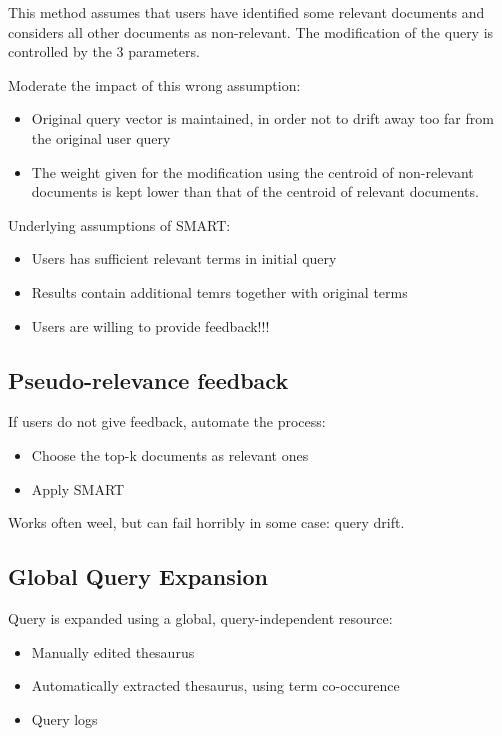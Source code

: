 This method assumes that users have identified some relevant documents
and considers all other documents as non-relevant. The modification of
the query is controlled by the 3 parameters.

Moderate the impact of this wrong assumption:
\begin{itemize}
\item Original query vector is maintained, in order not to drift away
  too far from the original user query
\item The weight given for the modification using the centroid of
  non-relevant documents is kept lower than that of the centroid of
  relevant documents.
\end{itemize}

Underlying assumptions of SMART:
\begin{itemize}
\item Users has sufficient relevant terms in initial query
\item Results contain additional temrs together with original terms
\item Users are willing to provide feedback!!!
\end{itemize}

\subsection{Pseudo-relevance feedback}

If users do not give feedback, automate the process:
\begin{itemize}
\item Choose the top-k documents as relevant ones
\item Apply SMART
\end{itemize}

Works often weel, but can fail horribly in some case: query drift.

\subsection{Global Query Expansion}

Query is expanded using a global, query-independent resource:
\begin{itemize}
\item Manually edited thesaurus
\item Automatically extracted thesaurus, using term co-occurence
\item Query logs
\end{itemize}

